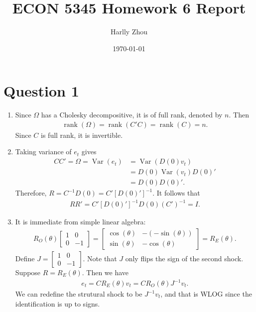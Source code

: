 \documentclass[12pt]{article}
\title{ECON 5345 Homework 6 Report}
\author{Harlly Zhou}
\date{\today}
\begin{document}
\maketitle

\section*{Question 1}
\begin{enumerate}[label=\alph*.]
    \item Since $\Omega$ has a Cholesky decompositive, it is of full rank, denoted by $n$. Then
    \begin{align*}
        \operatorname{rank}(\Omega) = \operatorname{rank}(C'C) = \operatorname{rank}(C) = n.
    \end{align*}
    Since $C$ is full rank, it is invertible.

    \item Taking variance of $e_t$ gives
    \begin{align*}
        CC' = \Omega = \operatorname{Var}(e_t) &= \operatorname{Var}(D(0)v_t)\\
        &= D(0) \operatorname{Var}(v_t) D(0)'\\
        &= D(0) D(0)'.
    \end{align*}
    Therefore, $R = C^{-1} D(0) = C'[D(0)']^{-1}$. It follows that
    \begin{align*}
        RR' = C'[D(0)']^{-1} D(0)(C')^{-1} = I.
    \end{align*}

    \item It is immediate from simple linear algebra:
    \begin{align*}
        R_O(\theta)
        \begin{bmatrix}
            1 & 0 \\
            0 & -1
        \end{bmatrix} = \begin{bmatrix}
            \cos (\theta) & -(-\sin (\theta)) \\
            \sin (\theta) & -\cos (\theta)
        \end{bmatrix}
        = R_E(\theta).
    \end{align*}
    Define $J= \begin{bmatrix}
        1 & 0 \\
        0 & -1
    \end{bmatrix}$. Note that $J$ only flips the sign of the second shock. Suppose $R = R_E(\theta)$. Then we have
    \begin{align*}
        e_t = C R_E(\theta)v_t = C R_O(\theta) J^{-1} v_t.
    \end{align*}
    We can redefine the strutural shock to be $J^{-1} v_t$, and that is WLOG since the identification is up to signs.
\end{enumerate}
\end{document}
